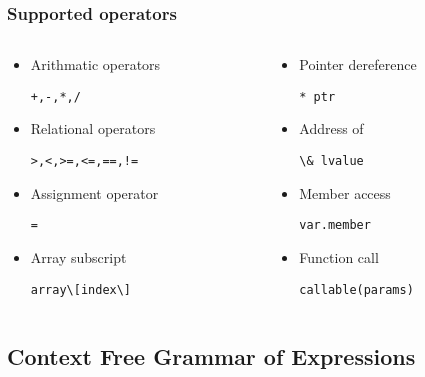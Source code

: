 \documentclass{beamer}
\begin{document}
\begin{frame}
    \frametitle{Supported operators}

    \begin{columns}
        \begin{column}[]{0.5\textwidth}
            \begin{itemize}
                \item Arithmatic operators

                      \lstinline{+,-,*,/}
                \item Relational operators

                      \lstinline{>,<,>=,<=,==,!=}
                \item Assignment operator

                      \lstinline{=}
                \item Array subscript

                      \lstinline{array\[index\]}
            \end{itemize}
        \end{column}

        \begin{column}[]{0.5\textwidth}
            \begin{itemize}
                \item Pointer dereference

                      \lstinline{* ptr}
                \item Address of

                      \lstinline{\& lvalue}
                \item Member access

                      \lstinline{var.member}
                \item Function call

                      \lstinline{callable(params)}
            \end{itemize}
        \end{column}
    \end{columns}

\end{frame}

\subsection{Context Free Grammar of Expressions}
\end{document}
